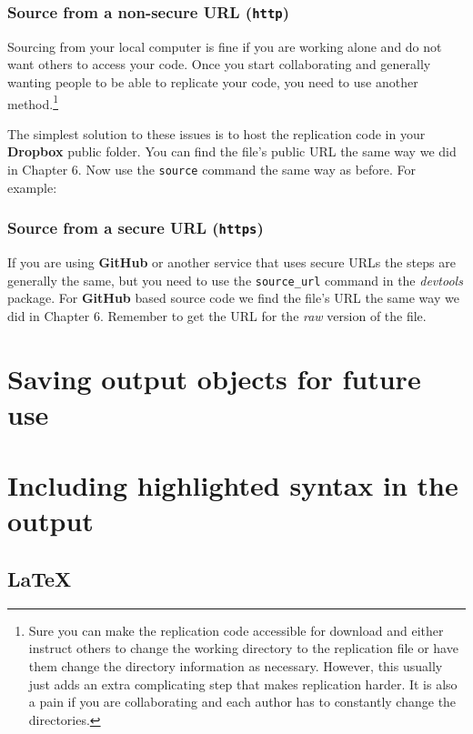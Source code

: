 \documentclass[ChapterTOCs,krantz1]{krantz}\usepackage{graphicx, color}
\begin{document}
\subsubsection{Source from a non-secure URL (\texttt{http})}

Sourcing from your local computer is fine if you are working alone and
do not want others to access your code. Once you start collaborating and
generally wanting people to be able to replicate your code, you need to
use another method.\footnote{Sure you can make the replication code
  accessible for download and either instruct others to change the
  working directory to the replication file or have them change the
  directory information as necessary. However, this usually just adds an
  extra complicating step that makes replication harder. It is also a
  pain if you are collaborating and each author has to constantly change
  the directories.}

The simplest solution to these issues is to host the replication code in
your \textbf{Dropbox} public folder. You can find the file's public URL
the same way we did in Chapter 6. Now use the \texttt{source} command
the same way as before. For example:

\subsubsection{Source from a secure URL (\texttt{https})}

If you are using \textbf{GitHub} or another service that uses secure
URLs the steps are generally the same, but you need to use the
\texttt{source\_url} command in the \emph{devtools} package. For
\textbf{GitHub} based source code we find the file's URL the same way we
did in Chapter 6. Remember to get the URL for the \emph{raw} version of
the file.

\section{Saving output objects for future use}

\section{Including highlighted syntax in the output}

\subsection{\LaTeX}
\end{document}
